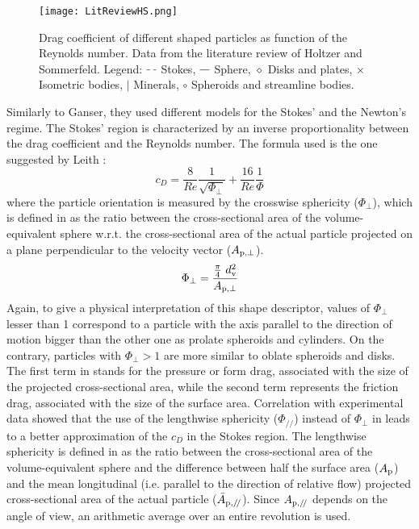 		\begin{figure}
			\centering
			\texttt{[image: LitReviewHS.png]}
			\caption[Drag coefficient of different shaped particles as function of the Reynolds number.]{Drag coefficient of different shaped particles as function of the Reynolds number. Data from the literature review of Holtzer and Sommerfeld. \cite{HoltzerSommerfeld-2008}
			Legend: $ \tikz[baseline] {\draw[dashed] (0,.7ex)--(.3,.7ex) ;} $ Stokes, 
			$ \tikz[baseline] {\draw (0,.7ex)--(.3,.7ex) ;} $ Sphere,
			$ \diamond $ Disks and plates, $ \times $ Isometric bodies, $ | $ Minerals, $ \circ $ Spheroids and streamline bodies.}
			\label{fig: LitReviewHS}
		\end{figure}

		Similarly to Ganser, they used different models for the Stokes' and the Newton's regime. The Stokes' region is characterized by an inverse proportionality between the drag coefficient and the Reynolds number. The formula used is the one suggested by Leith \cite{Leith-1987}:
		\begin{equation}
			c_D = \frac{8}{Re} \frac{1}{\sqrt{\Phi_{\perp}}} + \frac{16}{Re} \frac{1}{\Phi}
			\label{eq: Leith}
		\end{equation}
		where the particle orientation is measured by the crosswise sphericity ($ \Phi_{\perp} $), which is defined in  as the ratio between the cross-sectional area of the volume-equivalent sphere w.r.t. the cross-sectional area of the actual particle projected on a plane perpendicular to the velocity vector ($ A_{\textup{p}, \perp} $).
		\begin{equation}
			\Phi_{\perp} = \dfrac{\frac{\pi}{4}\ d_{\textup{v}}^2} {A_{\textup{p}, \perp}}
			\label{eq: Crosswise}
		\end{equation}
		Again, to give a physical interpretation of this shape descriptor, values of $ \Phi_{\perp} $ lesser than 1 correspond to a particle with the axis parallel to the direction of motion bigger than the other one as prolate spheroids and cylinders. On the contrary, particles with $ \Phi_{\perp} > 1 $ are more similar to oblate spheroids and disks.
		The first term in  stands for the pressure or form drag, associated with the size of the projected cross-sectional area, while the second term represents the friction drag, associated with the size of the surface area. Correlation with experimental data showed that the use of the lengthwise sphericity ($ \Phi_{/\!/} $) instead of $ \Phi_{\perp} $ in  leads to a better approximation of the $ c_D $ in the Stokes region. The lengthwise sphericity is defined in  as the ratio between the cross-sectional area of the volume-equivalent sphere and the difference between half the surface area ($ A_{\textup{p}} $) and the mean longitudinal (i.e. parallel to the direction of relative flow) projected cross-sectional area of the actual particle ($ \bar{A}_{\textup{p},/\!/} $). Since $ A_{\textup{p},/\!/} $ depends on the angle of view, an arithmetic average over an entire revolution is used.
